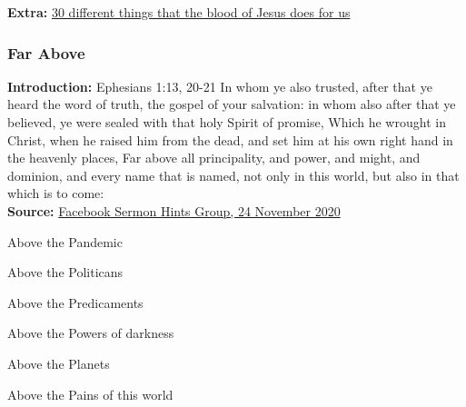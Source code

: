 \textbf{Extra:} \href{https://www.sharefaith.com/blog/2014/07/30-blood-of-jesus/?fbclid=IwAR0_1S4LzOqw-u03YpAxYvvTw066k3zHIgq32rq5hqQ0wzG1eYrJPQjXnl8}{30 different things that the blood of Jesus does for us}


\subsubsection{Far Above}
\textbf{Introduction:} Ephesians 1:13, 20-21  In whom ye also trusted, after that ye heard the word of truth, the gospel of your salvation: in whom also after that ye believed, ye were sealed with that holy Spirit of promise,
Which he wrought in Christ, when he raised him from the dead, and set him at his own right hand in the heavenly places, 
Far above all principality, and power, and might, and dominion, and every name that is named, not only in this world, but also in that which is to come:\\
\noindent \textbf{Source:} \href{https://www.facebook.com/groups/sermonhints/posts/2856629071245555}{Facebook Sermon Hints Group, 24 November 2020}
\begin{compactenum}[I.]
    \item Above the Pandemic 
    \item Above the Politicans
    \item Above the Predicaments
    \item Above the Powers of darkness 
    \item Above the Planets
    \item Above the Pains of this world
\end{compactenum}



